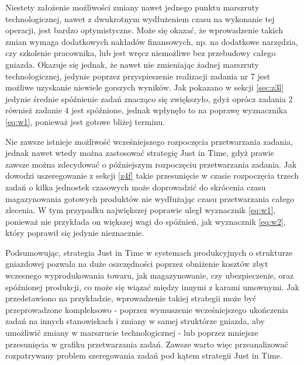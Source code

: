 \documentclass[twoside]{kInzynierka}
\begin{document}
Niestety założenie możliwości zmiany nawet jednego punktu marszruty technologicznej, nawet z dwukrotnym wydłużeniem czasu na wykonanie tej operacji, jest bardzo optymistyczne. Może się okazać, że wprowadzenie takich zmian wymaga dodatkowych nakładów finansowych, np. na dodatkowe narzędzia, czy szkolenie pracownika, lub jest wręcz niemożliwe bez przebudowy całego gniazda. Okazuje się jednak, że nawet nie zmieniając żadnej marszruty technologicznej, jedynie poprzez przyspieszenie realizacji zadania nr 7 jest możliwe uzyskanie niewiele gorszych wyników. Jak pokazano w sekcji \ref{sec:z3l} jedynie średnie spóźnienie zadań znacząco się zwiększyło, gdyż oprócz zadania 2 również zadanie 4 jest spóźnione, jednak wpłynęło to na poprawę wyznacznika \eqref{eq:w1}, ponieważ jest gotowe bliżej terminu.

Nie zawsze istnieje możliwość wcześniejszego rozpoczęcia przetwarzania zadania, jednak nawet wtedy można zastosować strategię Just in Time, gdyż prawie zawsze można zdecydować o późniejszym rozpoczęciu przetwarzania zadania. Jak dowodzi uszeregowanie z sekcji \ref{z4f} takie przesunięcie w czasie rozpoczęcia trzech zadań o kilka jednostek czasowych może doprowadzić do skrócenia czasu magazynowania gotowych produktów nie wydłużając czasu przetwarzania całego zlecenia. W tym przypadku największej poprawie uległ wyznacznik \eqref{eq:w1}, ponieważ nie przykłada on większej wagi do spóźnień, jak wyznacznik \eqref{eq:w2}, który poprawił się jedynie nieznacznie.

Podsumowując, strategia Just in Time w systemach produkcyjnych o strukturze gniazdowej pozwala na duże oszczędności poprzez obniżenie kosztów zbyt wczesnego wyprodukowania towaru, jak magazynowanie, czy ubezpieczenie, oraz spóźnionej produkcji, co może się wiązać między innymi z karami umownymi. Jak przedstawiono na przykładzie, wprowadzenie takiej strategii może być przeprowadzone kompleksowo - poprzez wymuszenie wcześniejszego ukończenia zadań na innych stanowiskach i zmiany w samej struktórze gniazda, aby umożliwić zmiany w marszrucie technologicznej - lub poprzez mniejsze przesunięcia w grafiku przetwarzania zadań. Zawsze warto więc przeanalizować rozpatrywany problem szeregowania zadań pod kątem strategii Just in Time.
\end{document}
